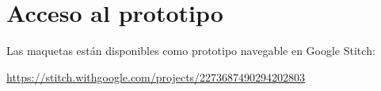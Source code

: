 \section{Acceso al prototipo}

Las maquetas están disponibles como prototipo navegable en Google Stitch:

\begin{center}
  \url{https://stitch.withgoogle.com/projects/2273687490294202803}
\end{center}